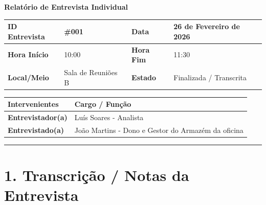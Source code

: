 \documentclass[11pt,a4paper]{article}
\begin{document}
	
	{\noindent\LARGE\bfseries\color{primaryblue} Relatório de Entrevista Individual}
	\\[0.5cm]
	
	\renewcommand{\arraystretch}{1.5}
	\begin{tabularx}{\textwidth}{@{}|l|X|l|X|@{}}
		\hline
		\rowcolor{gray!10} \textbf{ID Entrevista} & \#001 & \textbf{Data} & 26 de Fevereiro de 2026 \\ \hline
		\textbf{Hora Início} & 10:00 & \textbf{Hora Fim} & 11:30 \\ \hline
		\textbf{Local/Meio} & Sala de Reuniões B & \textbf{Estado} & Finalizada / Transcrita \\ \hline
	\end{tabularx}
	
	\vspace{0.5cm}
	
	\begin{tabularx}{\textwidth}{@{}|l|X|@{}}
		\hline
		\rowcolor{gray!10} \textbf{Intervenientes} & \textbf{Cargo / Função} \\ \hline
		\textbf{Entrevistador(a)} & Luís Soares - Analista\\ \hline
		\textbf{Entrevistado(a)}  & João Martins - Dono e Gestor do Armazém da oficina \\ \hline
	\end{tabularx}
	
	\vspace{0.8cm}
	
	\hrule %
	\vspace{0.2cm}
	
	\section*{1. Transcrição / Notas da Entrevista}
	
\end{document}
